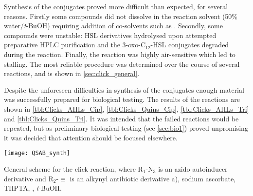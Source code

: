 Synthesis of the conjugates proved more difficult than expected, for several reasons. Firstly some compounds did not dissolve in the reaction solvent (50\% water/\textit{t}-BuOH) requiring addition of co-solvents such as . Secondly, some compounds were unstable: HSL derivatives hydrolysed upon attempted preparative HPLC purification and the 3-oxo-C$_{12}$-HSL conjugates degraded during the reaction. Finally, the reaction was highly air-sensitive which led to stalling. 
The most reliable procedure was determined over the course of several reactions, and is shown in \ref{sec:click_general}. 

Despite the unforeseen difficulties in synthesis of the conjugates enough material was successfully prepared for biological testing. The results of the reactions are shown in \ref{tbl:Clicks_AHLs_Cip}, \ref{tbl:Clicks_Quins_Cip}, \ref{tbl:Clicks_AHLs_Tri} and \ref{tbl:Clicks_Quins_Tri}. It was intended that the failed reactions would be repeated, but as preliminary biological testing (see \ref{sec:bio1}) proved unpromising it was decided that attention should be focused elsewhere.


\begin{scheme}[H]
	\begin{center}
		\texttt{[image: QSAB\_synth]}
		\caption{General scheme for the click reaction, where R$_1$-N$_3$ is an azido autoinducer derivative and R$_2$-$\equiv$ is an alkynyl antibiotic derivative a), sodium ascorbate, THPTA, , \textit{t}-BuOH.\label{sch:QSAB_synth}} 
	\end{center}
\end{scheme}

